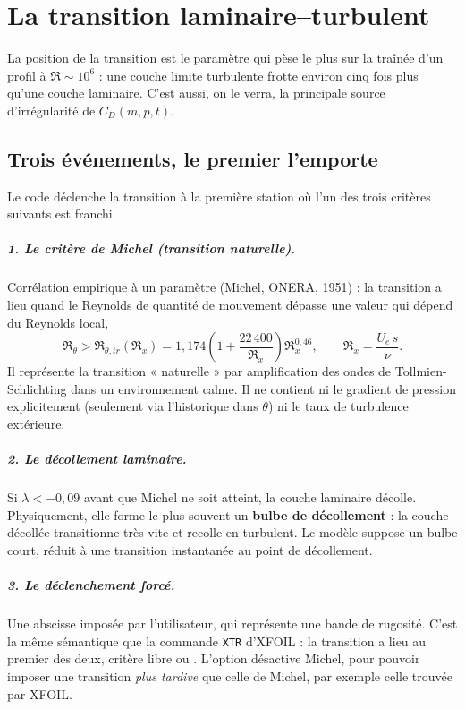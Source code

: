 \chapter{La transition laminaire--turbulent}\label{ch:transition}

La position de la transition est le paramètre qui pèse le plus sur la traînée d'un profil à $\Re\sim10^6$ : une couche limite turbulente frotte environ cinq fois plus qu'une couche laminaire. C'est aussi, on le verra, la principale source d'irrégularité de $C_D(m,p,t)$.

\section{Trois événements, le premier l'emporte}
Le code déclenche la transition à la première station où l'un des trois critères suivants est franchi.

\paragraph{1. Le critère de Michel (transition naturelle).} Corrélation empirique à un paramètre (Michel, ONERA, 1951) : la transition a lieu quand le Reynolds de quantité de mouvement dépasse une valeur qui dépend du Reynolds local,
\[
\Re_\theta>\Re_{\theta,tr}(\Re_x)=1{,}174\left(1+\frac{22\,400}{\Re_x}\right)\Re_x^{0{,}46},\qquad \Re_x=\frac{U_e\,s}{\nu}.
\]
Il représente la transition « naturelle » par amplification des ondes de Tollmien-Schlichting dans un environnement calme. Il ne contient ni le gradient de pression explicitement (seulement via l'historique dans $\theta$) ni le taux de turbulence extérieure.

\paragraph{2. Le décollement laminaire.} Si $\lambda<-0{,}09$ avant que Michel ne soit atteint, la couche laminaire décolle. Physiquement, elle forme le plus souvent un \textbf{bulbe de décollement} : la couche décollée transitionne très vite et recolle en turbulent. Le modèle suppose un bulbe court, réduit à une transition instantanée au point de décollement.

\paragraph{3. Le déclenchement forcé.} Une abscisse  imposée par l'utilisateur, qui représente une bande de rugosité. C'est la même sémantique que la commande \texttt{XTR} d'XFOIL : la transition a lieu au premier des deux, critère libre ou . L'option  désactive Michel, pour pouvoir imposer une transition \emph{plus tardive} que celle de Michel, par exemple celle trouvée par XFOIL.

